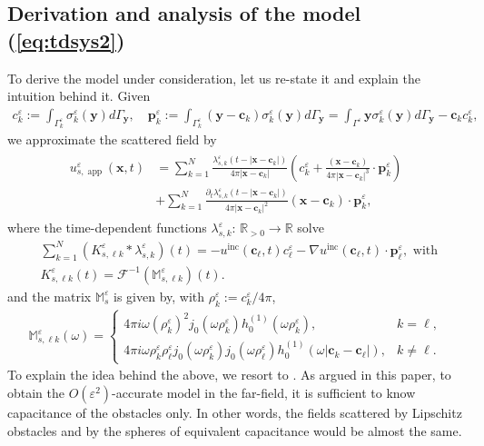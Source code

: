 \documentclass[]{article}
\numberwithin{equation}{section}
\numberwithin{theorem}{section}
\numberwithin{lemma}{section}
\numberwithin{corollary}{section}
\numberwithin{proposition}{section}
\numberwithin{definition}{section}
\newcommand{\bc}{\boldsymbol{c}}
\newcommand{\re}{\varepsilon}
\renewcommand{\vec}{\boldsymbol}
\begin{document}
	\subsection{Derivation and analysis of the model (\ref{eq:tdsys2})}
	\label{sec:simplified}
	To derive the model under consideration, let us re-state it and explain the intuition behind it. Given
	\begin{align}
		\label{eq:ckre2}
		c_k^{\varepsilon}:=\int_{\Gamma^{\varepsilon}_k}\sigma^{\varepsilon}_k(\vec{y})d\Gamma_{\vec{y}}, \quad \vec{p}_k^{\varepsilon}:=\int_{\Gamma^{\varepsilon}_k}(\vec{y}-\bc_k)\sigma_k^{\varepsilon}(\vec{y})d\Gamma_{\vec{y}}=\int_{\Gamma^{\varepsilon}}\vec{y}\sigma_k^{\varepsilon}(\vec{y})d\Gamma_{\vec{y}}-\vec{c}_k c_k^{\varepsilon},
	\end{align}
	we approximate the scattered field by
	\begin{align}
		\label{eq:scatap}
		\begin{split}
			{u}^{\varepsilon}_{s, \operatorname{app}}(\vec{x},t)&=\sum\limits_{k=1}^N\frac{\lambda^{\re}_{s, k}(t-|\vec{x}-\bc_k|)}{4\pi|\vec{x}-\bc_k|}\left(c_k^{\varepsilon}+\frac{(\vec{x}-\bc_k)}{4\pi|\vec{x}-\bc_k|^3}\cdot \vec{p}_k^{\varepsilon}\right)\\
			&+\sum\limits_{k=1}^N\frac{\partial_t\lambda^{\re}_{s, k}(t-|\vec{x}-\bc_k|)}{4\pi|\vec{x}-\bc_k|^2}(\vec{x}-\bc_k)\cdot\vec{p}_k^{\varepsilon},
		\end{split}
	\end{align}
	where the time-dependent functions $\lambda^{\re}_{s, k}: \, \mathbb{R}_{>0}\rightarrow \mathbb{R}$ solve 
	\begin{align}
		\label{eq:tdsys2p}
		& \sum_{k=1}^N (K^{\re}_{s, \ell k}*\lambda^{\re}_{s, k})(t)= - u^{\operatorname{inc}}(\bc_{\ell}, t)c_{\ell}^{\re}-\nabla u^{\operatorname{inc}}(\bc_{\ell}, t)\cdot\vec{p}_{\ell}^{\re}, \text{ with }\\
		\nonumber
		&K^{\re}_{s, \ell k }(t) = \mathcal{F}^{-1} (\mathbb{M}^{\re}_{s, \ell k})(t).
	\end{align}
	and the matrix $\mathbb{M}^{\re}_{s} $ is given by, with $\rho^{\re}_k:= c^{\re}_k/4 \pi$,  
	\begin{align*}%
		\mathbb{M}^{\re}_{s, \ell k}(\omega)=
		\left\{
		\begin{array}{ll}
			4 \pi i \omega (\rho^{\re}_k)^2 j_0(\omega \rho^{\re}_k) h^{(1)}_0(\omega \rho^{\re}_k), &k = \ell, \\
			4 \pi i \omega \rho^{\re}_k \rho^{\re}_{\ell} j_0(\omega \rho^{\re}_k) j_0(\omega \rho^{\re}_{\ell}) h^{(1)}_0(\omega |\bc_k - \bc_{\ell}| ), &k \neq \ell.
		\end{array}
		\right.
	\end{align*}
	To explain the idea behind the above, we resort to \cite{sini_frequency_domain}. As argued in this paper, to obtain the $O(\varepsilon^2)$-accurate model in the far-field, it is sufficient to know capacitance of the obstacles only. In other words, the fields scattered by Lipschitz obstacles and by the spheres of equivalent capacitance would be almost the same. 
	
\end{document}

